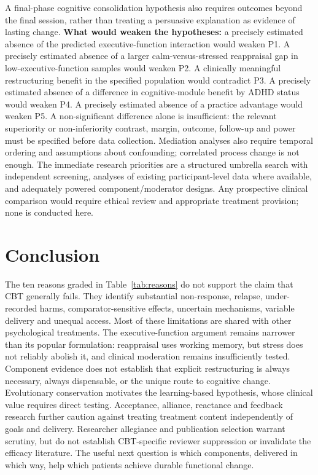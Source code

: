 A final-phase cognitive consolidation hypothesis also requires outcomes beyond the final session, rather than treating a persuasive explanation as evidence of lasting change.
\textbf{What would weaken the hypotheses:} a precisely estimated absence of the predicted executive-function interaction would weaken P1.
A precisely estimated absence of a larger calm-versus-stressed reappraisal gap in low-executive-function samples would weaken P2.
A clinically meaningful restructuring benefit in the specified population would contradict P3.
A precisely estimated absence of a difference in cognitive-module benefit by ADHD status would weaken P4.
A precisely estimated absence of a practice advantage would weaken P5.
A non-significant difference alone is insufficient: the relevant superiority or non-inferiority contrast, margin, outcome, follow-up and power must be specified before data collection.
Mediation analyses also require temporal ordering and assumptions about confounding; correlated process change is not enough.
The immediate research priorities are a structured umbrella search with independent screening, analyses of existing participant-level data where available, and adequately powered component/moderator designs.
Any prospective clinical comparison would require ethical review and appropriate treatment provision; none is conducted here.

\section{Conclusion}
The ten reasons graded in Table~\ref{tab:reasons} do not support the claim that CBT generally fails.
They identify substantial non-response, relapse, under-recorded harms, comparator-sensitive effects, uncertain mechanisms, variable delivery and unequal access.
Most of these limitations are shared with other psychological treatments.
The executive-function argument remains narrower than its popular formulation: reappraisal uses working memory, but stress does not reliably abolish it, and clinical moderation remains insufficiently tested.
Component evidence does not establish that explicit restructuring is always necessary, always dispensable, or the unique route to cognitive change.
Evolutionary conservation motivates the learning-based hypothesis, whose clinical value requires direct testing.
Acceptance, alliance, reactance and feedback research further caution against treating treatment content independently of goals and delivery.
Researcher allegiance and publication selection warrant scrutiny, but do not establish CBT-specific reviewer suppression or invalidate the efficacy literature.
The useful next question is which components, delivered in which way, help which patients achieve durable functional change.
